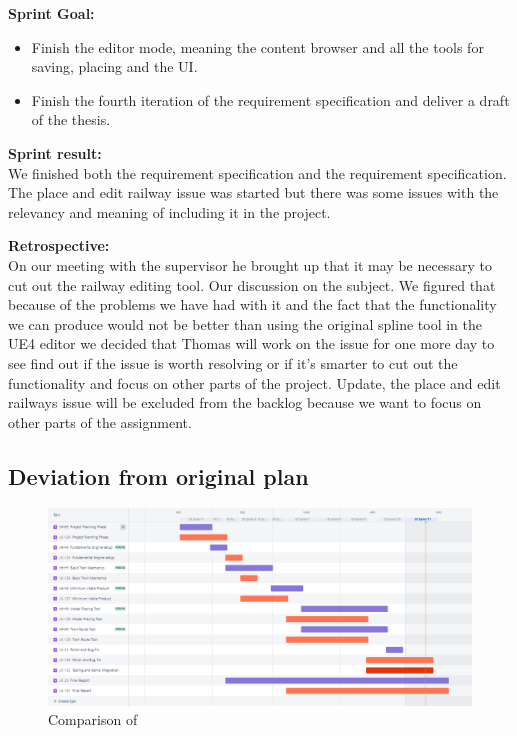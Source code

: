 \textbf{Sprint Goal:} \\
\begin{itemize}
    \item Finish the editor mode, meaning the content browser and all the tools for saving, placing and the UI.
    \item Finish the fourth iteration of the requirement specification and deliver a draft of the thesis.
\end{itemize}

\textbf{Sprint result:} \\
We finished both the requirement specification and the requirement specification. The place and edit railway issue was started but there was some issues with the relevancy and meaning of including it in the project. 

\textbf{Retrospective:} \\
On our meeting with the supervisor he brought up that it may be necessary to cut out the railway editing tool. Our discussion on the subject. We figured that because of the problems we have had with it and the fact that the functionality we can produce would not be better than using the original spline tool in the UE4 editor we decided that Thomas will work on the issue for one more day to see find out if the issue is worth resolving or if it's smarter to cut out the functionality and focus on other parts of the project.
Update, the place and edit railways issue will be excluded from the backlog because we want to focus on other parts of the assignment.




\subsection{Deviation from original plan}
\bigskip
\begin{figure}[H]
    \centering
    \vspace{12pt}
    \includegraphics[width=12cm]{figures/Jira comparisoncroped.png}
    \caption{Comparison of }
    \label{Epic_comparison_img}
\end{figure} 
\bigskip \bigskip




